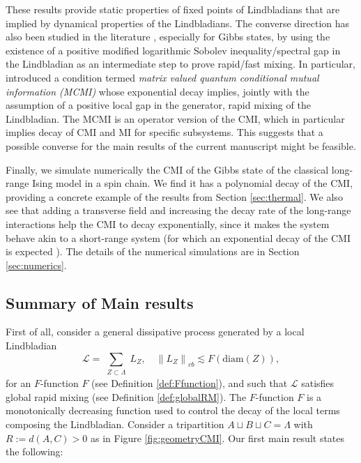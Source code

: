 \documentclass[11pt]{article}
\numberwithin{equation}{section}
\numberwithin{figure}{section}
\numberwithin{table}{section}
\theoremstyle{definition}
\theoremstyle{plain}
\theoremstyle{remark}
\newcommand{\Li}{\mathcal{L}}
\newcommand{\La}{\Lambda}
\newcommand{\normm}[2]{\left\lVert#1\right\rVert_{#2}}
\newcommand{\summ}[1]{\sum\limits_{\substack{ #1 }}}
\begin{document}
These results provide static properties of fixed points of Lindbladians that are implied by dynamical properties of the Lindbladians. The converse direction has also been studied in the literature \cite{Bardet_2023,Bardet_2024,kochanowski_rapid_2025,Capel2024Gibbs,kastoryano_gibbs_2016,art:2localPaper,BardetCapelLuciaPerezGarciaRouze-HeatBath1DMLSI-2019,bergamaschi2026fastmixingquantumspin}, especially for Gibbs states, by using the existence of a positive modified logarithmic Sobolev inequality/spectral gap in the Lindbladian as an intermediate step to prove rapid/fast mixing. In particular, \cite{Capel2024Gibbs} introduced a condition termed \textit{matrix valued quantum conditional mutual information (MCMI)} whose exponential decay implies, jointly with the assumption of a positive local gap in the generator, rapid mixing of the Lindbladian. The MCMI is an operator version of the CMI, which in particular implies decay of CMI and MI for specific subsystems. This suggests that a possible converse for the main results of the current manuscript might be feasible. %


Finally, we simulate numerically the CMI of the Gibbs state of the classical long-range Ising model in a spin chain. We find it has a polynomial decay of the CMI, providing a concrete example of the results from Section \ref{sec:thermal}. We also see that adding a transverse field and increasing the decay rate of the long-range interactions help the CMI to decay exponentially, since it makes the system behave akin to a short-range system (for which an exponential decay of the CMI is expected \cite{chen_quantum_2025}). The details of the numerical simulations are in Section \ref{sec:numerics}.


\subsection{Summary of Main results}\label{sec:mainResults}

First of all, consider a general dissipative process generated by a local Lindbladian \[\Li=\summ{Z\subset \La}L_Z,\quad \normm{L_Z}{cb}\lesssim F(\text{diam}(Z)),\]for an $F$-function $F$ (see Definition \ref{def:Ffunction}), and such that $\Li$ satisfies global rapid mixing (see Definition \ref{def:globalRM}). The $F$-function $F$ is a monotonically decreasing function used to control the decay of the local terms composing the Lindbladian. Consider a tripartition $A\sqcup B \sqcup C=\La $ with $R:=d(A,C) >0$ as in Figure \ref{fig:geometryCMI}. Our first main result states the following: 
\end{document}
